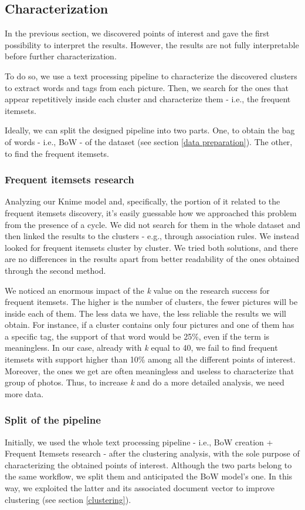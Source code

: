 \documentclass[runningheads]{llncs}
\begin{document}
\subsection{Characterization}\label{leonardo}
In the previous section, we discovered points of interest and gave the first possibility to interpret the results. However, the results are not fully interpretable before further characterization.

To do so, we use a text processing pipeline to characterize the discovered clusters to extract words and tags from each picture. Then, we search for the ones that appear repetitively inside each cluster and characterize them - i.e., the frequent itemsets.

Ideally, we can split the designed pipeline into two parts. One, to obtain the bag of words - i.e., BoW - of the dataset (see section \ref{data preparation}). The other, to find the frequent itemsets.

\subsubsection{Frequent itemsets research}
Analyzing our Knime model and, specifically, the portion of it related to the frequent itemsets discovery, it's easily guessable how we approached this problem from the presence of a cycle. We did not search for them in the whole dataset and then linked the results to the clusters - e.g., through association rules. We instead looked for frequent itemsets cluster by cluster. We tried both solutions, and there are no differences in the results apart from better readability of the ones obtained through the second method.

We noticed an enormous impact of the {\itshape k} value on the research success for frequent itemsets. The higher is the number of clusters, the fewer pictures will be inside each of them. The less data we have, the less reliable the results we will obtain. For instance, if a cluster contains only four pictures and one of them has a specific tag, the support of that word would be 25\%, even if the term is meaningless. In our case, already with {\itshape k} equal to 40, we fail to find frequent itemsets with support higher than 10\% among all the different points of interest. Moreover, the ones we get are often meaningless and useless to characterize that group of photos. Thus, to increase {\itshape k} and do a more detailed analysis, we need more data.

\subsubsection{Split of the pipeline}
Initially, we used the whole text processing pipeline - i.e., BoW creation + Frequent Itemsets research - after the clustering analysis, with the sole purpose of characterizing the obtained points of interest. Although the two parts belong to the same workflow, we split them and anticipated the BoW model's one. In this way, we exploited the latter and its associated document vector to improve clustering (see section \ref{clustering}).
\end{document}
